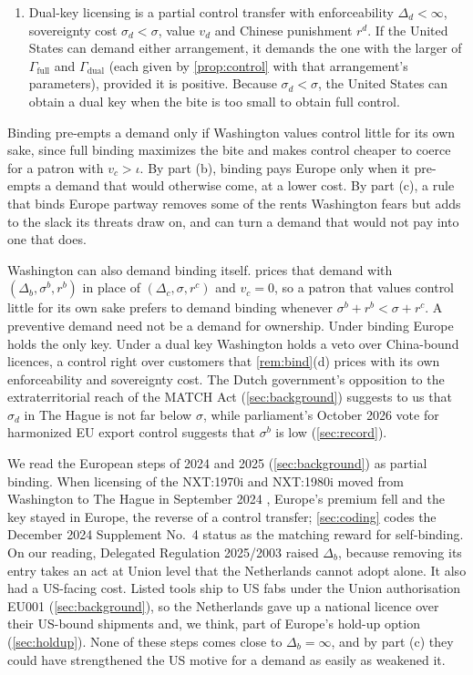 \begin{remark}
\begin{enumerate}[label=(\alph*)]
\item Dual-key licensing is a partial control transfer with enforceability $\Delta_d<\infty$, sovereignty cost $\sigma_d<\sigma$, value $v_d$ and Chinese punishment $r^d$. If the United States can demand either arrangement, it demands the one with the larger of $\Gamma_{\mathrm{full}}$ and $\Gamma_{\mathrm{dual}}$ (each given by \cref{prop:control} with that arrangement's parameters), provided it is positive. Because $\sigma_d<\sigma$, the United States can obtain a dual key when the bite is too small to obtain full control.
\end{enumerate}
\end{remark}

Binding pre-empts a demand only if Washington values control little for its own sake, since full binding maximizes the bite and makes control cheaper to coerce for a patron with $v_c>\iota$. By part (b), binding pays Europe only when it pre-empts a demand that would otherwise come, at a lower cost. By part (c), a rule that binds Europe partway removes some of the rents Washington fears but adds to the slack its threats draw on, and can turn a demand that would not pay into one that does.

Washington can also demand binding itself.  prices that demand with $(\Delta_b,\sigma^b,r^b)$ in place of $(\Delta_c,\sigma,r^c)$ and $v_c=0$, so a patron that values control little for its own sake prefers to demand binding whenever $\sigma^b+r^b<\sigma+r^c$. A preventive demand need not be a demand for ownership. Under binding Europe holds the only key. Under a dual key Washington holds a veto over China-bound licences, a control right over customers that \cref{rem:bind}(d) prices with its own enforceability and sovereignty cost. The Dutch government's opposition to the extraterritorial reach of the MATCH Act (\cref{sec:background}) suggests to us that $\sigma_d$ in The Hague is not far below $\sigma$, while parliament's October 2026 vote for harmonized EU export control suggests that $\sigma^b$ is low (\cref{sec:record}).

We read the European steps of 2024 and 2025 (\cref{sec:background}) as partial binding. When licensing of the NXT:1970i and NXT:1980i moved from Washington to The Hague in September 2024 \citep{stcrt2024duv}, Europe's premium fell and the key stayed in Europe, the reverse of a control transfer; \cref{sec:coding} codes the December 2024 Supplement No.~4 status as the matching reward for self-binding. On our reading, Delegated Regulation 2025/2003 \citep{eu2025dualuse} raised $\Delta_b$, because removing its entry takes an act at Union level that the Netherlands cannot adopt alone. It also had a US-facing cost. Listed tools ship to US fabs under the Union authorisation EU001 (\cref{sec:background}), so the Netherlands gave up a national licence over their US-bound shipments and, we think, part of Europe's hold-up option (\cref{sec:holdup}). None of these steps comes close to $\Delta_b=\infty$, and by part (c) they could have strengthened the US motive for a demand as easily as weakened it.

